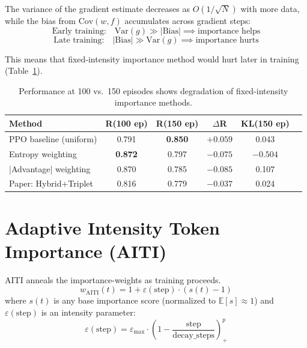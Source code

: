 \documentclass[11pt,a4paper]{article}
\begin{document}
The variance of the gradient estimate decreases as $O(1/\sqrt{N})$ with more data, while the bias from $\text{Cov}(w, f)$ accumulates across gradient steps:
\begin{equation}
\text{Early training:}\quad \text{Var}(g) \gg |\text{Bias}| \implies \text{importance helps}
\end{equation}
\begin{equation}
\text{Late training:}\quad |\text{Bias}| \gg \text{Var}(g) \implies \text{importance hurts}
\end{equation}

This means that fixed-intensity importance method would hurt later in training (Table~\ref{tab:degradation}).

\begin{table}[h]
\centering
\caption{Performance at 100 vs.\ 150 episodes shows degradation of fixed-intensity importance methods.}
\label{tab:degradation}
\begin{tabular}{lccccc}
\toprule
\textbf{Method} & \textbf{R(100 ep)} & \textbf{R(150 ep)} & \textbf{$\Delta$R} & \textbf{KL(150 ep)} \\
\midrule
PPO baseline (uniform) & 0.791 & \textbf{0.850} & $+0.059$ & 0.043 \\
Entropy weighting & \textbf{0.872} & 0.797 & $-0.075$ & $-0.504$ \\
|Advantage| weighting & 0.870 & 0.785 & $-0.085$ & 0.107 \\
Paper: Hybrid+Triplet & 0.816 & 0.779 & $-0.037$ & 0.024 \\
\bottomrule
\end{tabular}
\end{table}

\section{Adaptive Intensity Token Importance (AITI)}
\label{sec:aiti}


AITI anneals the importance-weights as training proceeds.
\begin{equation}
\label{eq:aiti}
w_{\text{AITI}}(t) = 1 + \varepsilon(\text{step}) \cdot (s(t) - 1)
\end{equation}
where $s(t)$ is any base importance score (normalized to $\mathbb{E}[s] \approx 1$) and $\varepsilon(\text{step})$ is an intensity parameter:
\begin{equation}
\varepsilon(\text{step}) = \varepsilon_{\max} \cdot \left(1 - \frac{\text{step}}{\text{decay\_steps}}\right)_+^p
\end{equation}
\end{document}
